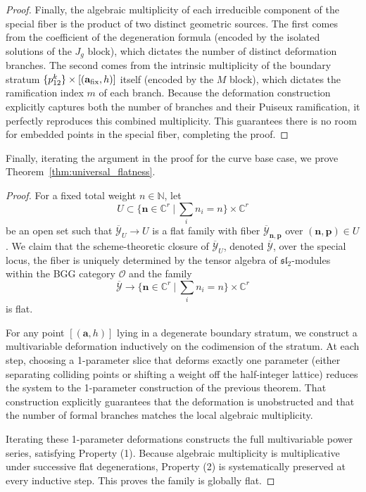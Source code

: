 \documentclass[11pt]{amsart}
\theoremstyle{remark}
\numberwithin{equation}{section}
\begin{document}
\begin{proof}
Finally, the algebraic multiplicity of each irreducible component of the special fiber is the product of two distinct geometric sources. The first comes from the coefficient of the degeneration formula (encoded by the isolated solutions of the $J_g$ block), which dictates the number of distinct deformation branches. The second comes from the intrinsic multiplicity of the boundary stratum $\{p_{12}^k\} \times [(\mathbf{a}_{\rm fix}, h)]$ itself (encoded by the $M$ block), which dictates the ramification index $m$ of each branch. Because the deformation construction explicitly captures both the number of branches and their Puiseux ramification, it perfectly reproduces this combined multiplicity. This guarantees there is no room for embedded points in the special fiber, completing the proof.
\end{proof}

Finally, iterating the argument in the proof for the curve base case, we prove Theorem~\ref{thm:universal_flatness}.
\begin{proof}
For a fixed total weight $n\in \mathbb{N}$, let
\[
    U \subset \Big\{ \mathbf{n} \in \mathbb{C}^r \ \Big| \ \sum_i n_i = n \Big\} \times \mathbb{C}^r
\]
be an open set such that $\overline{\mathcal{Y}}_U \rightarrow U$ is a flat family with fiber $\overline{\mathcal{Y}}_{\mathbf{n},\mathbf{p}}$ over $(\mathbf{n},\mathbf{p}) \in U$. We claim that the scheme-theoretic closure of $\overline{\mathcal{Y}}_U$, denoted $\overline{\mathcal{Y}}$, over the special locus, the fiber is uniquely determined by the tensor algebra of $\mathfrak{sl}_2$-modules within the BGG category $\mathcal{O}$ and the family 
\[
\overline{\mathcal{Y}} \rightarrow \Big\{ \mathbf{n} \in \mathbb{C}^r \ \Big| \ \sum_i n_i = n \Big\} \times \mathbb{C}^r
\]
is flat. 

For any point $[(\mathbf{a},h)]$ lying in a degenerate boundary stratum, we construct a multivariable deformation inductively on the codimension of the stratum. At each step, choosing a 1-parameter slice that deforms exactly one parameter (either separating colliding points or shifting a weight off the half-integer lattice) reduces the system to the 1-parameter construction of the previous theorem. That construction explicitly guarantees that the deformation is unobstructed and that the number of formal branches matches the local algebraic multiplicity. 

Iterating these 1-parameter deformations constructs the full multivariable power series, satisfying Property (1). Because algebraic multiplicity is multiplicative under successive flat degenerations, Property (2) is systematically preserved at every inductive step. This proves the family is globally flat.
\end{proof}
\end{document}
